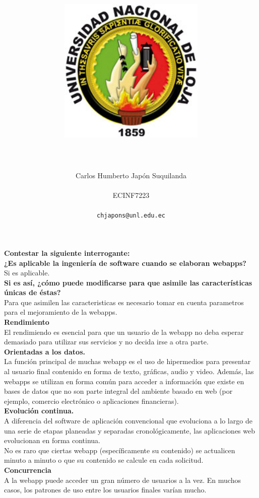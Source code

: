 \documentclass[12pt]{report}
\title{\includegraphics[width=7cm, height=7cm]{unl.jpg}}
\author{\\\\ Carlos Humberto Japón Suquilanda \\\\ ECINF7223 \\\\ \texttt{chjapons@unl.edu.ec}}
\begin{document}
\maketitle

\textbf{Contestar la siguiente interrogante:}\\

\textbf{¿Es aplicable la ingeniería de software cuando se elaboran webapps?}\\

Si es aplicable.\\

\textbf{Si es así, ¿cómo puede modificarse para que asimile las características únicas de éstas?}\\

Para que asimilen las caracteristicas es necesario tomar en cuenta parametros para el mejoramiento de la webapps.\\

\textbf{Rendimiento}\\

El rendimiendo es esencial para que un usuario de la webapp no deba esperar demasiado para utilizar sus servicios y no decida irse a otra parte.\\

\textbf{Orientadas a los datos.}\\

La función principal de muchas webapp es el uso de hipermedios para presentar al usuario final contenido en forma de texto, gráficas, audio y video. Además, las webapps se utilizan en forma común para acceder a información que existe en bases de datos que no son parte integral del ambiente basado en web (por ejemplo, comercio electrónico o aplicaciones financieras).\\

\textbf{Evolución continua.}\\

A diferencia del software de aplicación convencional que evoluciona a lo largo de una serie de etapas planeadas y separadas cronológicamente, las aplicaciones
web evolucionan en forma continua.\\

No es raro que ciertas webapp (específicamente su contenido) se actualicen minuto a minuto o que su contenido se calcule en cada solicitud.\\

\textbf{Concurrencia}\\

A la webapp puede acceder un gran número de usuarios a la vez. En muchos casos, los patrones de uso entre los usuarios finales varían mucho.\\
\end{document}
